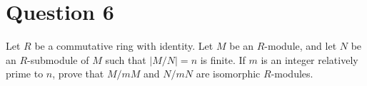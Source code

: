 \section{Question 6}

\begin{question}
    Let $R$ be a commutative ring with identity. Let $M$ be an $R$-module, and let $N$ be an $R$-submodule of $M$ such that $|M / N|=n$ is finite. If $m$ is an integer relatively prime to $n$, prove that $M / m M$ and $N / m N$ are isomorphic $R$-modules.
\end{question}

\begin{answer}
    
\end{answer}